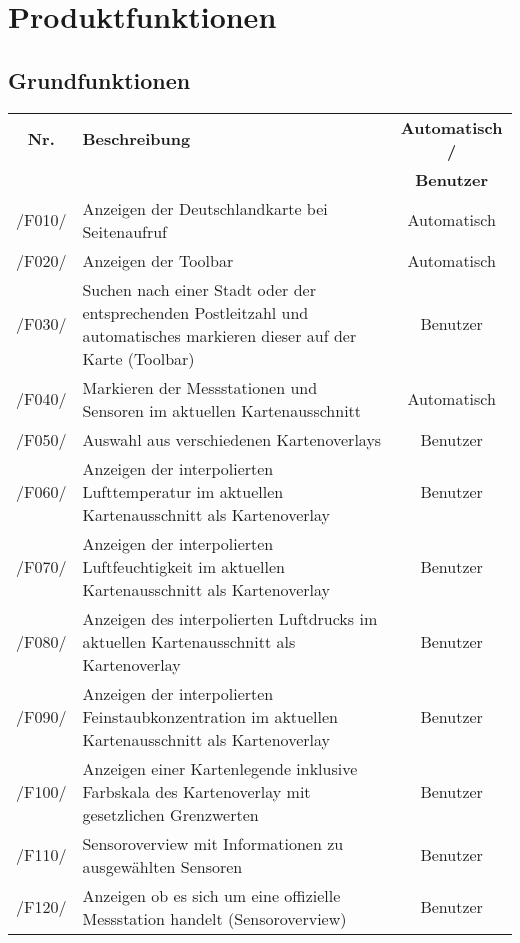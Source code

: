 \clearpage
\section{Produktfunktionen}
\subsection{Grundfunktionen}
\begin{tabularx}{\textwidth}{| c | X | c |}
\hline
        \textbf{Nr.} & 
        \textbf{Beschreibung} & 
        \textbf{Automatisch /} \\
        & & \textbf{Benutzer} \\
        \hline
        /F010/ & Anzeigen der Deutschlandkarte bei Seitenaufruf & Automatisch \\
        \hline
        /F020/ & Anzeigen der Toolbar & Automatisch \\
        \hline
        /F030/ & Suchen nach einer Stadt oder der entsprechenden Postleitzahl und automatisches markieren dieser auf der Karte (Toolbar) & Benutzer \\
        \hline
        /F040/ & Markieren der Messstationen und Sensoren im aktuellen Kartenausschnitt & Automatisch \\
        \hline
        /F050/ & Auswahl aus verschiedenen Kartenoverlays & Benutzer \\
        \hline
        /F060/ & Anzeigen der interpolierten Lufttemperatur im aktuellen Kartenausschnitt als Kartenoverlay & Benutzer \\
        \hline
        /F070/ & Anzeigen der interpolierten Luftfeuchtigkeit im aktuellen Kartenausschnitt als Kartenoverlay & Benutzer \\
        \hline
        /F080/ & Anzeigen des interpolierten Luftdrucks im aktuellen Kartenausschnitt als Kartenoverlay & Benutzer \\
        \hline
        /F090/ & Anzeigen der interpolierten Feinstaubkonzentration im aktuellen Kartenausschnitt als Kartenoverlay & Benutzer \\
        \hline
        /F100/ & Anzeigen einer Kartenlegende inklusive Farbskala des Kartenoverlay mit gesetzlichen Grenzwerten & Benutzer \\
        \hline
        /F110/ & Sensoroverview mit Informationen zu ausgewählten Sensoren & Benutzer \\
        \hline
        /F120/ & Anzeigen ob es sich um eine offizielle Messstation handelt (Sensoroverview) & Benutzer \\

\end{tabularx}
